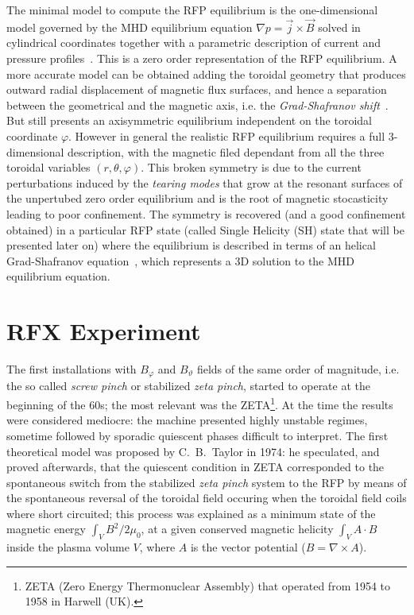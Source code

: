 The minimal model to compute the RFP equilibrium is the one-dimensional model governed by the MHD equilibrium equation $\nabla p = \Vec{j} \times \Vec{B}$ solved in cylindrical coordinates together with a parametric description of current and pressure profiles~\cite{Bonomo33}.
This is a zero order representation of the RFP equilibrium.
A more accurate model can be obtained adding the toroidal geometry that produces outward radial displacement of magnetic flux surfaces, and hence a separation between the geometrical and the magnetic axis, i.e. the \textit{Grad-Shafranov shift}~\cite{freidberg2014ideal}. But still presents an axisymmetric equilibrium independent on the toroidal coordinate $\varphi$. However in general the realistic RFP equilibrium requires a full 3-dimensional description, with the magnetic filed dependant from all the three toroidal variables $(r,\theta,\varphi)$. This broken symmetry is due to the current perturbations induced by the \emph{tearing modes} that grow at the resonant surfaces of the unpertubed zero order equilibrium and is the root of magnetic stocasticity leading to poor confinement.
The symmetry is recovered (and a good confinement obtained) in a particular RFP state (called Single Helicity (SH) state that will be presented later on) where the equilibrium is described in terms of an helical Grad-Shafranov equation~\cite{Bonomo35, Bonomo36}, which represents a 3D solution to the MHD equilibrium equation.

\section{RFX Experiment}
The first installations with $B_\varphi$ and $B_\vartheta$ fields of the same order of magnitude, i.e. the so called \textit{screw pinch} or stabilized \textit{zeta pinch}, started to operate at the beginning of the 60s; the most relevant was the ZETA\footnote{ZETA (Zero Energy Thermonuclear Assembly) that operated from 1954 to 1958 in Harwell (UK).}. At the time the results were considered mediocre: the machine presented highly unstable regimes, sometime followed by sporadic quiescent phases difficult to interpret. The first theoretical model was proposed by C.~B.~Taylor in 1974\cite{taylor}: he speculated, and proved afterwards, that the quiescent condition in ZETA corresponded to the spontaneous switch from the stabilized \textit{zeta pinch} system to the RFP by means of the spontaneous reversal of the toroidal field occuring when the toroidal field coils where short circuited; this process was explained as a minimum state of the magnetic energy $\int_V B^2/2\mu_0$, at a given conserved magnetic helicity $\int_V A \cdot B $ inside the plasma volume $V$, where $A$ is the vector potential ($B=\nabla \times A $).

